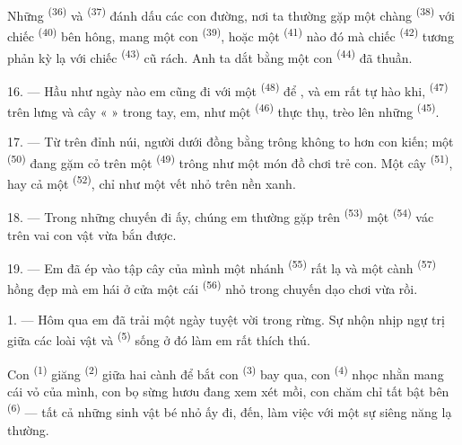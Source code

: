 Những  \textsuperscript{(36)} và 
\textsuperscript{(37)} đánh dấu các con đường, nơi ta thường gặp một chàng  \textsuperscript{(38)} với chiếc  \textsuperscript{(40)} bên hông,
mang một con  \textsuperscript{(39)}, hoặc một 
\textsuperscript{(41)} nào đó mà chiếc  \textsuperscript{(42)} tương
phản kỳ lạ với chiếc  \textsuperscript{(43)} cũ rách. Anh ta dắt
bằng  một con  \textsuperscript{(44)} đã thuần.

\VUsaut{3.0mm}

16. --- Hầu như ngày nào em cũng đi với một 
\textsuperscript{(48)} để , và em rất tự hào khi, 
\textsuperscript{(47)} trên lưng và cây «  » trong tay, em, như một
 \textsuperscript{(46)} thực thụ, trèo lên những 
\textsuperscript{(45)}.

17. --- Từ trên đỉnh núi, người dưới đồng bằng trông không to hơn con kiến; một
 \textsuperscript{(50)} đang gặm cỏ trên một 
\textsuperscript{(49)} trông như một món đồ chơi trẻ con. Một cây 
\textsuperscript{(51)}, hay cả một  \textsuperscript{(52)}, chỉ như
một vết nhỏ trên nền xanh.

18. --- Trong những chuyến đi ấy, chúng em thường gặp trên 
\textsuperscript{(53)} một  \textsuperscript{(54)} vác trên
vai con vật vừa bắn được.

19. --- Em đã ép vào tập cây của mình một nhánh 
\textsuperscript{(55)} rất lạ và một cành  \textsuperscript{(57)} hồng
đẹp mà em hái ở cửa một cái  \textsuperscript{(56)} nhỏ trong chuyến dạo
chơi vừa rồi.

\VUsaut{3.0mm}
\VUsaut{3.0mm}

\VUsaut{3.0mm}

1. --- Hôm qua em đã trải một ngày tuyệt vời trong rừng. Sự nhộn nhịp ngự trị giữa các
loài vật và  \textsuperscript{(5)} sống ở đó làm em rất thích thú.

Con  \textsuperscript{(1)} giăng  \textsuperscript{(2)} giữa
hai cành để bắt con  \textsuperscript{(3)} bay qua, con 
\textsuperscript{(4)} nhọc nhằn mang cái vỏ của mình, con bọ sừng hươu đang xem xét mồi,
con  chăm chỉ tất bật bên  \textsuperscript{(6)} — tất cả
những sinh vật bé nhỏ ấy đi, đến, làm việc với một sự siêng năng lạ thường.

